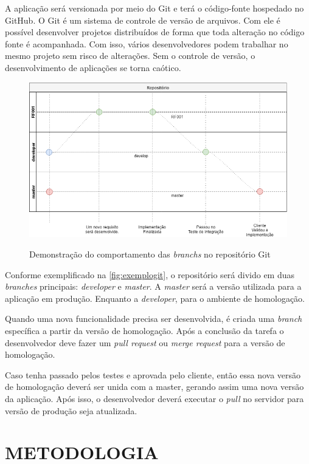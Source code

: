 A aplicação será versionada por meio do Git e terá o código-fonte hospedado no GitHub. O Git é um sistema de controle de versão de arquivos. Com ele é possível desenvolver projetos distribuídos de forma que toda alteração no código fonte é acompanhada. Com isso, vários desenvolvedores podem trabalhar no mesmo projeto sem risco de alterações. Sem o controle de versão, o desenvolvimento de aplicações se torna caótico.

\begin{figure}[H]
    \centering
    \caption{Demonstração do comportamento das \textit{branchs} no repositório Git}
    \includegraphics[width=13cm]{dados/figuras/git.png}
    \label{fig:exemplogit}
\end{figure}

Conforme exemplificado na \autoref{fig:exemplogit}, o repositório será divido em duas \textit{branches} principais: \textit{developer} e \textit{master}. A \textit{master} será a versão utilizada para a aplicação em produção. Enquanto a \textit{developer}, para o ambiente de homologação.

Quando uma nova funcionalidade precisa ser desenvolvida, é criada uma \textit{branch} específica a partir da versão de homologação. Após a conclusão da tarefa o desenvolvedor deve fazer um \textit{pull request} ou \textit{merge request} para a versão de homologação.

Caso tenha passado pelos testes e aprovada pelo cliente, então essa nova versão de homologação deverá ser unida com a master, gerando assim uma nova versão da aplicação. Após isso, o desenvolvedor deverá executar o \textit{pull} no servidor para versão de produção seja atualizada.

\section{METODOLOGIA}
\label{sec:metodologiadev}

